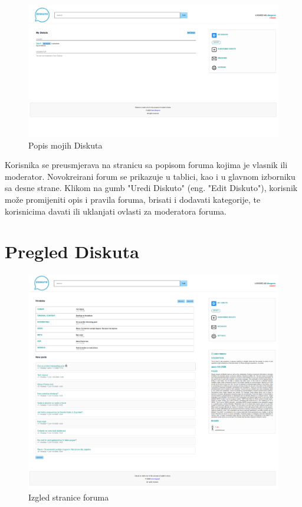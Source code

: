 \documentclass{foi}
\begin{document}
\begin{figure}[h!]
    \centering
    \includegraphics[width=1\textwidth]{slike/moji-forumi.png}
    \caption{Popis mojih Diskuta}
\end{figure}

Korisnika se preusmjerava na stranicu sa popisom foruma kojima je vlasnik ili moderator. Novokreirani forum se prikazuje u tablici, kao i u glavnom izborniku sa desne strane. Klikom na gumb "Uredi Diskuto" (eng. "Edit Diskuto"), korisnik može promijeniti opis i pravila foruma, brisati i dodavati kategorije, te korisnicima davati ili uklanjati ovlasti za moderatora foruma.

\section{Pregled Diskuta}

\begin{figure}[h!]
    \centering
    \includegraphics[width=1\textwidth]{slike/forum.png}
    \caption{Izgled stranice foruma}
    \label{forum}
\end{figure}
\end{document}
